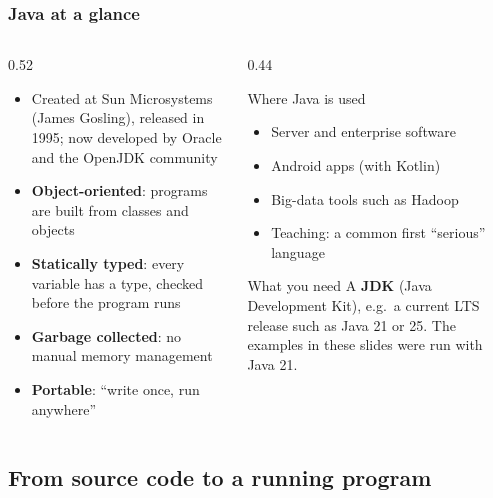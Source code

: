 \documentclass[aspectratio=169,10pt,compress]{beamer}
\begin{document}
\begin{frame}[t,fragile] \frametitle{Java at a glance}
  \begin{columns}[T]
    \begin{column}{0.52\textwidth}
      \begin{itemize}\small
        \item Created at Sun Microsystems (James Gosling), released in 1995; now developed by Oracle and the OpenJDK community
        \item \textbf{Object-oriented}: programs are built from classes and objects
        \item \textbf{Statically typed}: every variable has a type, checked before the program runs
        \item \textbf{Garbage collected}: no manual memory management
        \item \textbf{Portable}: ``write once, run anywhere''
      \end{itemize}
    \end{column}
    \begin{column}{0.44\textwidth}
      \begin{block}{Where Java is used}
        \small
        \begin{itemize}
          \item Server and enterprise software
          \item Android apps (with Kotlin)
          \item Big-data tools such as Hadoop
          \item Teaching: a common first ``serious'' language
        \end{itemize}
      \end{block}
      \begin{alertblock}{What you need}
        \small A \textbf{JDK} (Java Development Kit), e.g.\ a current LTS release such as Java 21 or 25.
        The examples in these slides were run with Java 21.
      \end{alertblock}
    \end{column}
  \end{columns}
\end{frame}

\subsection[JVM]{From source code to a running program}
\end{document}

